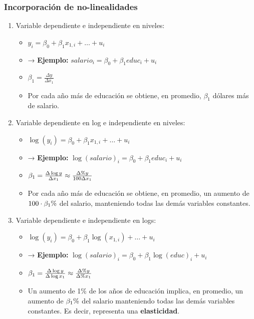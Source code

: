 \documentclass{beamer}
\newcommand{\pc}{\text{\char37}}
\begin{document}
\begin{frame}[shrink=10]
\frametitle{Incorporación de no-linealidades}
    \begin{enumerate}
        \item {\color{blue}Variable dependiente e independiente en niveles:}
        \begin{itemize}
            \item[] \begin{center}$y_i = \beta_0 + \beta_1 x_{1,i} + \ldots + u_i$\end{center}
            \item → \textbf{Ejemplo:} $salario_i = \beta_0 + \beta_1 educ_i + u_i$
            \item $\beta_1 = \frac{\Delta y}{\Delta x_1}$
            \item Por cada año más de educación se obtiene, en promedio, $\beta_1$ dólares más de salario.
        \end{itemize}
        \item {\color{blue}Variable dependiente en log e independiente en niveles:}
        \begin{itemize}
            \item[] \begin{center} $\log(y_i) = \beta_0 + \beta_1 x_{1,i} + \ldots + u_i$\end{center}
            \item → \textbf{Ejemplo:} $\log(salario)_i = \beta_0 + \beta_1 educ_i + u_i$
            \item $\beta_1 = \frac{\Delta \log y}{\Delta x_1}\approx \frac{\Delta \pc  y}{100\Delta x_1}$
            \item Por cada año más de educación se obtiene, en promedio, un aumento de $100 \cdot \beta_1 \pc$ del salario, manteniendo todas las demás variables constantes.
        \end{itemize}
        \item {\color{blue}Variable dependiente e independiente en logs:}
        \begin{itemize}
            \item[] \begin{center}$\log(y_i) = \beta_0 + \beta_1 \log(x_{1,i}) + \ldots + u_i$\end{center}
            \item → \textbf{Ejemplo:} $\log(salario)_i = \beta_0 + \beta_1 \log(educ)_i + u_i$
            \item $\beta_1 = \frac{\Delta \log y}{\Delta \log x_1}\approx \frac{\Delta\pc  y}{ \Delta\pc  x_1}$
            \item Un aumento de 1\% de los años de educación implica, en promedio, un aumento de $\beta_1 \pc$ del salario manteniendo todas las demás variables constantes. Es decir, representa una {\bf elasticidad}.
        \end{itemize}
    \end{enumerate}


\end{frame}
\end{document}
